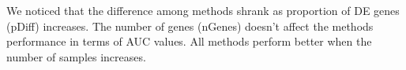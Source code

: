 We noticed that the difference among methods shrank as proportion of DE genes (pDiff) increases. The number of genes (nGenes) doesn't affect the methods performance in terms of AUC values. All methods perform better when the number of samples increases.







